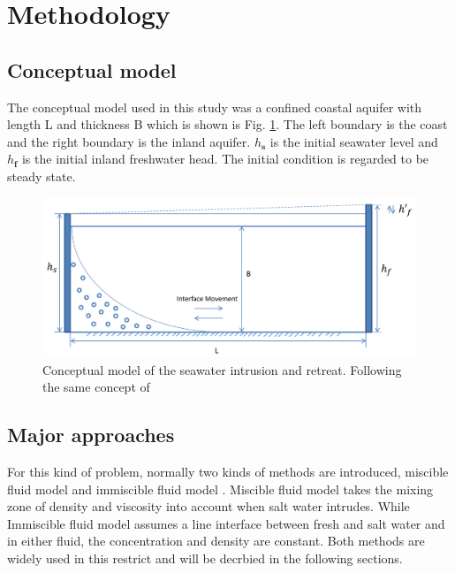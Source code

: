 \documentclass[review]{elsarticle}
\newcommand{\mbf}[1]{{\mathbf{#1}}}%
\begin{document}
\section{Methodology}


\subsection{Conceptual model}

The conceptual model used in this study was a confined coastal aquifer with length L and thickness B which is shown is Fig. \ref{fig:seawater_intrusion}. The left boundary is the coast and the right boundary is the inland aquifer. $h_\mbf{s}$ is the initial seawater level and $h_\mbf{f}$ is the initial inland freshwater head. The initial condition is regarded to be steady state. 
\begin{figure}
\centering
\includegraphics[width=1.0\textwidth]{figures/seawater_intrusion}
\caption{Conceptual model of the seawater intrusion and retreat. Following the same concept of \cite{lu2013timescales}}
\label{fig:seawater_intrusion}
\end{figure}

\subsection{Major approaches}
For this kind of problem, normally two kinds of methods are introduced, miscible fluid model and immiscible fluid model \cite{volker1982assessment}. Miscible fluid model takes the mixing zone of density and viscosity into account when salt water intrudes. While Immiscible fluid model assumes a line interface between fresh and salt water and in either fluid, the concentration and density are constant. 
Both methods are widely used in this restrict and will be decrbied in the following sections. \par 
\end{document}

